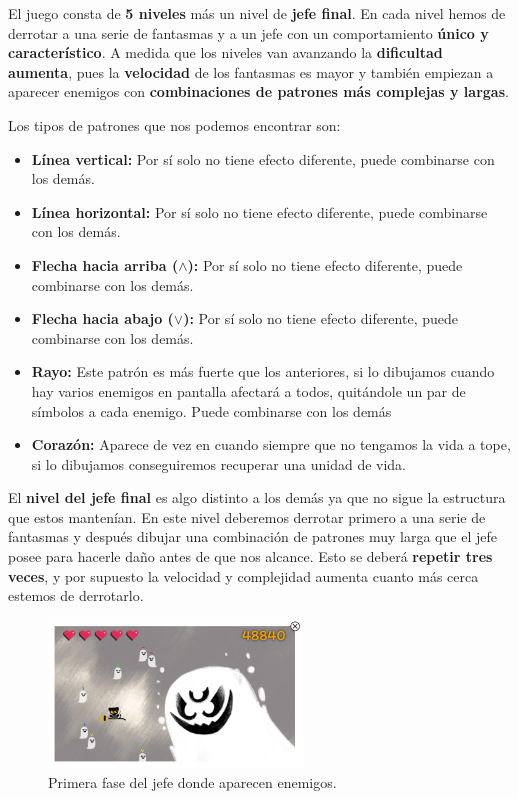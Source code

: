 \vspace{0.5cm}

El juego consta de \textbf{5 niveles} más un nivel de \textbf{jefe final}. En cada nivel hemos de derrotar a una serie de fantasmas y a un jefe con un comportamiento \textbf{único y característico}. A medida que los niveles van avanzando la \textbf{dificultad aumenta}, pues la \textbf{velocidad} de los fantasmas es mayor y también empiezan a aparecer enemigos con \textbf{combinaciones de patrones más complejas y largas}.

\vspace{0.5cm}

Los tipos de patrones que nos podemos encontrar son:

\begin{itemize}
  \item \textbf{Línea vertical:} Por sí solo no tiene efecto diferente, puede combinarse con los demás.
  \item \textbf{Línea horizontal:} Por sí solo no tiene efecto diferente, puede combinarse con los demás.
  \item \textbf{Flecha hacia arriba ($\wedge$):} Por sí solo no tiene efecto diferente, puede combinarse con los demás.
  \item \textbf{Flecha hacia abajo ($\vee$):} Por sí solo no tiene efecto diferente, puede combinarse con los demás.
  \item \textbf{Rayo:} Este patrón es más fuerte que los anteriores, si lo dibujamos cuando hay varios enemigos en pantalla afectará a todos, quitándole un par de símbolos a cada enemigo. Puede combinarse con los demás
  \item \textbf{Corazón:} Aparece de vez en cuando siempre que no tengamos la vida a tope, si lo dibujamos conseguiremos recuperar una unidad de vida.
\end{itemize}

\vspace{0.5cm}

El \textbf{nivel del jefe final} es algo distinto a los demás ya que no sigue la estructura que estos mantenían. En este nivel deberemos derrotar primero a una serie de fantasmas y después dibujar una combinación de patrones muy larga que el jefe posee para hacerle daño antes de que nos alcance. Esto se deberá \textbf{repetir tres veces}, y por supuesto la velocidad y complejidad aumenta cuanto más cerca estemos de derrotarlo.

\begin{figure}[htbp]
\centering
  \includegraphics[width=0.6\textwidth]{archivos/jefe-horda.png}
  \caption{Primera fase del jefe donde aparecen enemigos.}
  \label{fig:jefe1}
\end{figure}

